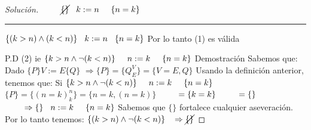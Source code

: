 \begin{proof}[Solución]
\newline
$ \hspace*{0.8cm} \cancel{\{ \}} \hspace*{0.3cm} k:=n \hspace*{.5cm} \{n=k\}$
\newline
\noindent\rule{6.5cm}{0.4pt}
\newline
$ \{(k>n) \wedge (k<n) \} \hspace*{0.3cm}  k:=n \hspace*{0.3cm} \{n=k \}$
\vspace*{0.3cm}
\newline
Por lo tanto (1) es válida
\vspace*{0.5cm}
\newline


P.D (2) ie $\{k>n \wedge \neg (k<n) \} \hspace*{.5cm}  n:=k \hspace*{.5cm} \{n=k \} $ 
\vspace*{0.5cm}
\newline
Demostración
\vspace*{0.3cm}
\newline
Sabemos que:
\newline
Dado $\{P\} V:=E \{Q\}$
\newline
$\Rightarrow  \{P\} = \{Q_{E}^{V} \} = \{V=E, Q \} $
\vspace*{0.3cm}
\newline
Usando la definición anterior, tenemos que:
Si $ \{k>n \wedge \neg (k<n) \} \hspace*{.5cm}  n:=k \hspace*{.5cm} \{n=k \} $  
\newline
$ \{ P \} = \{ (n=k)_{k}^{n} \} = \{n=k,(n=k)\} $
\newline
$ \hspace*{0.8cm} =\{ k=k \}$
\newline
$ \hspace*{0.8cm} = \{ \} $
\newline
$ \hspace*{0.8cm} \Rightarrow  \{ \} \hspace*{0.3cm} n:=k \hspace*{.5cm} \{n=k\} $
\newline
Sabemos que $ \{ \} $ fortalece cualquier aseveración.
\vspace*{0.3cm}
\newline
Por lo tanto tenemos:
\newline
$ \{(k>n) \wedge \neg(k<n) \} \hspace*{0.3cm} \Rightarrow  \cancel{\{ \}}$

\end{proof}
